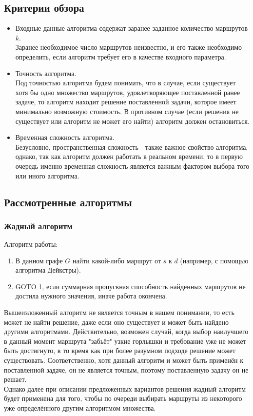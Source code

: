 \documentclass[a4paper]{article}
\begin{document}
\subsection{Критерии обзора}
\begin{itemize}
\item Входные данные алгоритма содержат заранее заданное количество маршрутов $k$.\\ Заранее необходимое число маршрутов неизвестно, и его также необходимо определить, если алгоритм требует его в качестве входного параметра.
\item Точность алгоритма.\\ Под точностью алгоритма будем понимать, что в случае, если существует хотя бы одно множество маршрутов, удовлетворяющее поставленной ранее задаче, то алгоритм находит решение поставленной задачи, которое имеет минимально возможную стоимость. В противном случае (если решения не существует или алгоритм не может его найти) алгоритм должен остановиться.
\item Временная сложность алгоритма.\\ Безусловно, пространственная сложность - также важное свойство алгоритма, однако, так как алгоритм должен работать в реальном времени, то в первую очередь именно временная сложность является важным фактором выбора того или иного алгоритма. 
\end{itemize}
\subsection{Рассмотренные алгоритмы}

\subsubsection{Жадный алгоритм}
Алгоритм работы:
\begin{enumerate}
\item В данном графе $G$ найти какой-либо маршрут от $s$ к $d$ (например, с помощью алгоритма Дейкстры).
\item GOTO 1, если суммарная пропускная способность найденных маршрутов не достила нужного значения, иначе работа окончена.
\end{enumerate}

Вышеизложенный алгоритм не является точным в нашем понимании, то есть может не найти решение, даже если оно существует и может быть найдено другими алгоритмами. Действительно, возможен случай, когда выбор наилучшего в данный момент маршрута "забьёт" узкие горлышки и требование уже не может быть достигнуто, в то время как при более разумном подходе решение может существовать. Соответственно, хотя данный алгоритм и может быть применён к поставленной задаче, он не является точным, поэтому поставленную задачу он не решает.\\
Однако далее при описании предложенных вариантов решения жадный алгоритм будет применена для того, чтобы по очереди выбирать маршруты из некоторого уже определённого  другим алгоритмом множества.
\end{document}
